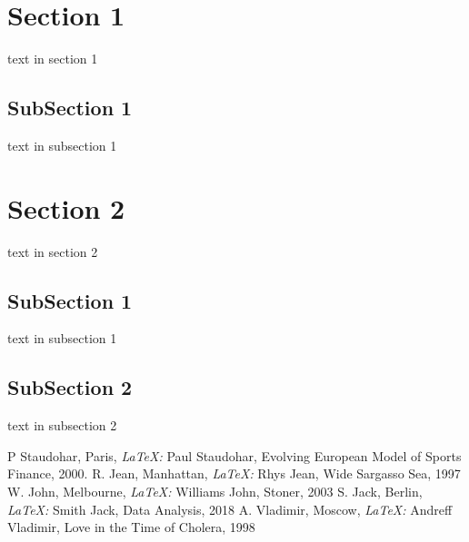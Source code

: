 \documentclass[10pt]{article}
\begin{document}
	
	\section{Section 1}
	text in section 1
	\subsection{SubSection 1}
	text in subsection 1
	\section{Section 2}
	text in section 2
	\subsection{SubSection 1}
	text in subsection 1
	\subsection{SubSection 2}
	text in subsection 2
	
	\pagebreak
	\begin{thebibliography}{9}
		
		P Staudohar, Paris,
		\textit{\LaTeX: }
		Paul Staudohar, 
		Evolving European Model of Sports Finance,
		2000.
		R. Jean, Manhattan,
		\textit{\LaTeX: }
		Rhys Jean, 
		Wide Sargasso Sea,
		1997
		W. John, Melbourne,
		\textit{\LaTeX: }
		Williams John, 
		Stoner,
		2003
		S. Jack, Berlin,
		\textit{\LaTeX: }
		Smith Jack,
		Data Analysis,
		2018
		A. Vladimir, Moscow,
		\textit{\LaTeX: }
		Andreff Vladimir, 
		Love in the Time of Cholera,
		1998
		
	\end{thebibliography}
\end{document}
